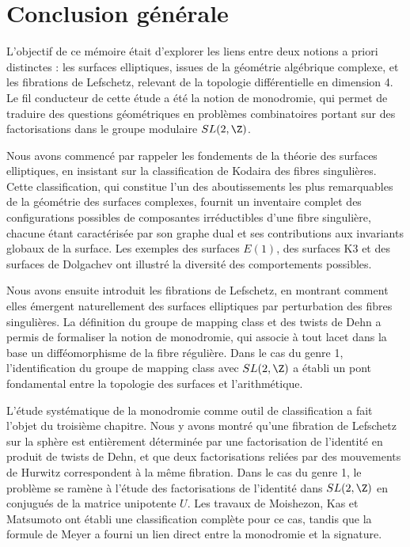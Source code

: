 \chapter*{Conclusion générale}

L'objectif de ce mémoire était d'explorer les liens entre deux notions a priori distinctes : les surfaces elliptiques, issues de la géométrie algébrique complexe, et les fibrations de Lefschetz, relevant de la topologie différentielle en dimension 4. Le fil conducteur de cette étude a été la notion de monodromie, qui permet de traduire des questions géométriques en problèmes combinatoires portant sur des factorisations dans le groupe modulaire $SL(2,\Z)$.

Nous avons commencé par rappeler les fondements de la théorie des surfaces elliptiques, en insistant sur la classification de Kodaira des fibres singulières. Cette classification, qui constitue l'un des aboutissements les plus remarquables de la géométrie des surfaces complexes, fournit un inventaire complet des configurations possibles de composantes irréductibles d'une fibre singulière, chacune étant caractérisée par son graphe dual et ses contributions aux invariants globaux de la surface. Les exemples des surfaces $E(1)$, des surfaces K3 et des surfaces de Dolgachev ont illustré la diversité des comportements possibles.

Nous avons ensuite introduit les fibrations de Lefschetz, en montrant comment elles émergent naturellement des surfaces elliptiques par perturbation des fibres singulières. La définition du groupe de mapping class et des twists de Dehn a permis de formaliser la notion de monodromie, qui associe à tout lacet dans la base un difféomorphisme de la fibre régulière. Dans le cas du genre 1, l'identification du groupe de mapping class avec $SL(2,\Z)$ a établi un pont fondamental entre la topologie des surfaces et l'arithmétique.

L'étude systématique de la monodromie comme outil de classification a fait l'objet du troisième chapitre. Nous y avons montré qu'une fibration de Lefschetz sur la sphère est entièrement déterminée par une factorisation de l'identité en produit de twists de Dehn, et que deux factorisations reliées par des mouvements de Hurwitz correspondent à la même fibration. Dans le cas du genre 1, le problème se ramène à l'étude des factorisations de l'identité dans $SL(2,\Z)$ en conjugués de la matrice unipotente $U$. Les travaux de Moishezon, Kas et Matsumoto ont établi une classification complète pour ce cas, tandis que la formule de Meyer a fourni un lien direct entre la monodromie et la signature.

